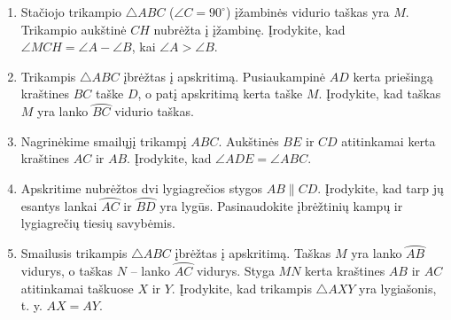 \documentclass[11pt,a4paper]{scrartcl}
\begin{document}
\begin{enumerate}
    \textit{Šis uždavinys susieja šiame handoute aptartas savybes su kita tema.}
    \item Stačiojo trikampio $\triangle ABC$ ($\angle C=90^\circ$) įžambinės vidurio taškas yra $M$. Trikampio aukštinė $CH$ nubrėžta į įžambinę. Įrodykite, kad $\angle MCH=\angle A-\angle B$, kai $\angle A>\angle B$.
    \item Trikampis $\triangle ABC$ įbrėžtas į apskritimą. Pusiaukampinė $AD$ kerta priešingą kraštines $BC$ taške $D$, o patį apskritimą kerta taške $M$. Įrodykite, kad taškas $M$ yra lanko $\wideparen{BC}$ vidurio taškas.
    \item Nagrinėkime smailųjį trikampį $ABC$. Aukštinės $BE$ ir $CD$ atitinkamai kerta kraštines $AC$ ir $AB$. Įrodykite, kad $\angle ADE=\angle ABC$.
    \item Apskritime nubrėžtos dvi lygiagrečios stygos $AB\parallel CD$. Įrodykite, kad tarp jų esantys lankai $\wideparen{AC}$ ir $\wideparen{BD}$ yra lygūs. Pasinaudokite įbrėžtinių kampų ir lygiagrečių tiesių savybėmis.
    \item Smailusis trikampis $\triangle ABC$ įbrėžtas į apskritimą. Taškas $M$ yra lanko $\wideparen{AB}$ vidurys, o taškas $N$ – lanko $\wideparen{AC}$ vidurys. Styga $MN$ kerta kraštines $AB$ ir $AC$ atitinkamai taškuose $X$ ir $Y$. Įrodykite, kad trikampis $\triangle AXY$ yra lygiašonis, t. y. $AX=AY$.
\end{enumerate}
\end{document}
